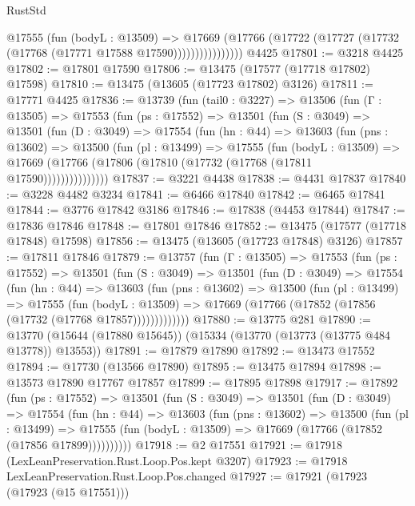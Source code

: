 \begin{lexlean}{RustStd}
\begin{coremodule}
                    @17555
                      (fun (bodyL : @13509) =>
                      @17669
                        (@17766
                          (@17722 (@17727 (@17732 (@17768 (@17771 @17588 @17590))))))))))))))))
    @4425
@17801 := @3218 @4425
@17802 := @17801 @17590
@17806 := @13475 (@17577 (@17718 @17802) @17598)
@17810 := @13475 (@13605 (@17723 @17802) @3126)
@17811 := @17771 @4425
@17836 := @13739
    (fun (tail0 : @3227) =>
    @13506
      (fun (Γ : @13505) =>
      @17553
        (fun (ps : @17552) =>
        @13501
          (fun (S : @3049) =>
          @13501
            (fun (D : @3049) =>
            @17554
              (fun (hn : @44) =>
              @13603
                (fun (pns : @13602) =>
                @13500
                  (fun (pl : @13499) =>
                  @17555
                    (fun (bodyL : @13509) =>
                    @17669 (@17766 (@17806 (@17810 (@17732 (@17768 (@17811 @17590)))))))))))))))
@17837 := @3221 @4438
@17838 := @4431 @17837
@17840 := @3228 @4482 @3234
@17841 := @6466 @17840
@17842 := @6465 @17841
@17844 := @3776 @17842 @3186
@17846 := @17838 (@4453 @17844)
@17847 := @17836 @17846
@17848 := @17801 @17846
@17852 := @13475 (@17577 (@17718 @17848) @17598)
@17856 := @13475 (@13605 (@17723 @17848) @3126)
@17857 := @17811 @17846
@17879 := @13757
    (fun (Γ : @13505) =>
    @17553
      (fun (ps : @17552) =>
      @13501
        (fun (S : @3049) =>
        @13501
          (fun (D : @3049) =>
          @17554
            (fun (hn : @44) =>
            @13603
              (fun (pns : @13602) =>
              @13500
                (fun (pl : @13499) =>
                @17555
                  (fun (bodyL : @13509) =>
                  @17669 (@17766 (@17852 (@17856 (@17732 (@17768 @17857)))))))))))))
@17880 := @13775 @281
@17890 := @13770 (@15644 (@17880 @15645)) (@15334 (@13770 (@13773 (@13775 @484 @13778)) @13553))
@17891 := @17879 @17890
@17892 := @13473 @17552
@17894 := @17730 (@13566 @17890)
@17895 := @13475 @17894
@17898 := @13573 @17890 @17767 @17857
@17899 := @17895 @17898
@17917 := @17892
    (fun (ps : @17552) =>
    @13501
      (fun (S : @3049) =>
      @13501
        (fun (D : @3049) =>
        @17554
          (fun (hn : @44) =>
          @13603
            (fun (pns : @13602) =>
            @13500
              (fun (pl : @13499) =>
              @17555 (fun (bodyL : @13509) => @17669 (@17766 (@17852 (@17856 @17899))))))))))
@17918 := @2 @17551
@17921 := @17918 (LexLeanPreservation.Rust.Loop.Pos.kept @3207)
@17923 := @17918 LexLeanPreservation.Rust.Loop.Pos.changed
@17927 := @17921 (@17923 (@17923 (@15 @17551)))

\end{coremodule}
\end{lexlean}
